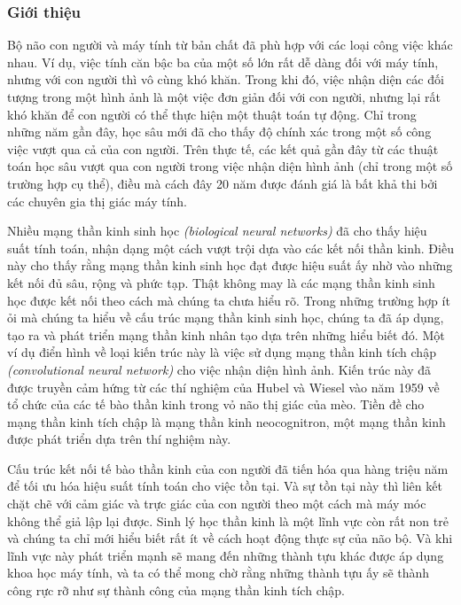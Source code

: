 \subsubsection{Giới thiệu}
Bộ não con người và máy tính từ bản chất đã phù hợp với các loại công việc khác nhau. Ví dụ, việc tính căn bậc ba của một số lớn rất dễ dàng đối với máy tính, nhưng với con người thì vô cùng khó khăn. Trong khi đó, việc nhận diện các đối tượng trong một hình ảnh là một việc đơn giản đối với con người, nhưng lại rất khó khăn để con người có thể thực hiện một thuật toán tự động. Chỉ trong những năm gần đây, học sâu mới đã cho thấy độ chính xác trong một số công việc vượt qua cả của con người. Trên thực tế, các kết quả gần đây từ các thuật toán học sâu vượt qua con người trong việc nhận diện hình ảnh (chỉ trong một số trường hợp cụ thể), điều mà cách đây 20 năm được đánh giá là bất khả thi bởi các chuyên gia thị giác máy tính.\cite{Aggarwal2023-zk}

Nhiều mạng thần kinh sinh học \textit{(biological neural networks)} đã cho thấy hiệu suất tính toán, nhận dạng một cách vượt trội dựa vào các kết nối thần kinh. Điều này cho thấy rằng mạng thần kinh sinh học đạt được hiệu suất ấy nhờ vào những kết nối đủ sâu, rộng và phức tạp. Thật không may là các mạng thần kinh sinh học được kết nối theo cách mà chúng ta chưa hiểu rõ. Trong những trường hợp ít ỏi mà chúng ta hiểu về cấu trúc mạng thần kinh sinh học, chúng ta đã áp dụng, tạo ra và phát triển mạng thần kinh nhân tạo dựa trên những hiểu biết đó. Một ví dụ điển hình về loại kiến trúc này là việc sử dụng mạng thần kinh tích chập \textit{(convolutional neural network)} cho việc nhận diện hình ảnh. Kiến trúc này đã được truyền cảm hứng từ các thí nghiệm của Hubel và Wiesel vào năm 1959 về tổ chức của các tế bào thần kinh trong vỏ não thị giác của mèo. Tiền đề cho mạng thần kinh tích chập là mạng thần kinh neocognitron, một mạng thần kinh được phát triển dựa trên thí nghiệm này.\cite{Aggarwal2023-zk}

Cấu trúc kết nối tế bào thần kinh của con người đã tiến hóa qua hàng triệu năm để tối ưu hóa hiệu suất tính toán cho việc tồn tại. Và sự tồn tại này thì liên kết chặt chẽ với cảm giác và trực giác của con người theo một cách mà máy móc không thể giả lập lại được. Sinh lý học thần kinh là một lĩnh vực còn rất non trẻ và chúng ta chỉ mới hiểu biết rất ít về cách hoạt động thực sự của não bộ. Và khi lĩnh vực này phát triển mạnh sẽ mang đến những thành tựu khác được áp dụng khoa học máy tính, và ta có thể mong chờ rằng những thành tựu ấy sẽ thành công rực rỡ như sự thành công của mạng thần kinh tích chập.\cite{Aggarwal2023-zk}

